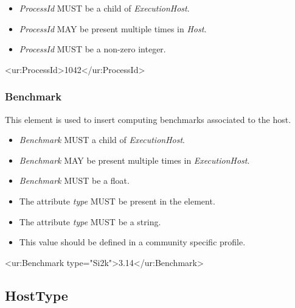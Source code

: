 \begin{itemize}
\item \emph{ProcessId} MUST be a child of \emph{ExecutionHost}.
\item \emph{ProcessId}  MAY be present multiple times in \emph{Host}.
\item \emph{ProcessId}  MUST be a non-zero integer.
\end{itemize}

\begin{XMLexample}
<ur:ProcessId>1042</ur:ProcessId>
\end{XMLexample}

\subsubsection{Benchmark}

This element is used to insert computing benchmarks associated to the host.
\begin{itemize}
\item \emph{Benchmark} MUST a child of \emph{ExecutionHost}.
\item \emph{Benchmark} MAY be present multiple times in \emph{ExecutionHost}.
\item \emph{Benchmark} MUST be a float.
\item The attribute \emph{type} MUST be present in the element.
\item The attribute \emph{type} MUST be a string.
\item This value should be defined in a community specific profile.
\end{itemize}

\begin{XMLexample}
<ur:Benchmark type="Si2k">3.14</ur:Benchmark>
\end{XMLexample}






\subsection{HostType} \label{ComputeHostType}

